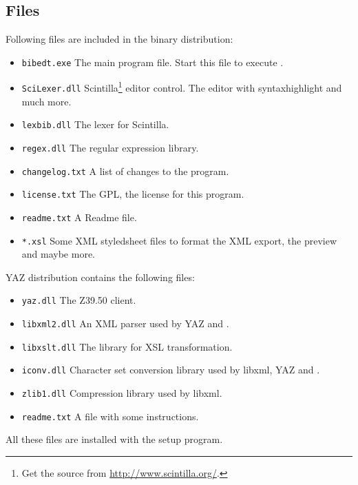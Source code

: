 \documentclass[oneside,10pt]{article}
\begin{document}
\subsection{Files}
\label{sec:Files}

Following files are included in the binary distribution:
\begin{itemize}
  \item \verb|bibedt.exe| The main program file. Start this file to execute \BibEdt{}.
  \item \verb|SciLexer.dll| Scintilla\footnote{Get the source from \url{http://www.scintilla.org/}.}
    editor control. The editor with syntaxhighlight and much more.
  \item \verb|lexbib.dll| The \BibTeX{} lexer for Scintilla.
  \item \verb|regex.dll| The regular expression library.
  \item \verb|changelog.txt| A list of changes to the program.
  \item \verb|license.txt| The GPL, the license for this program.
  \item \verb|readme.txt| A Readme file.
  \item \verb|*.xsl| Some XML styledsheet files to format the XML export, the preview
    and maybe more.
\end{itemize}
YAZ distribution contains the following files:
\begin{itemize}
  \item \verb|yaz.dll| The Z39.50 client.
  \item \verb|libxml2.dll| An XML parser used by YAZ and \BibEdt{}.
  \item \verb|libxslt.dll| The library for XSL transformation.
  \item \verb|iconv.dll| Character set conversion library used by libxml, YAZ and \BibEdt{}.
  \item \verb|zlib1.dll| Compression library used by libxml.
  \item \verb|readme.txt| A file with some instructions.
\end{itemize}
All these files are installed with the setup program.
\end{document}
